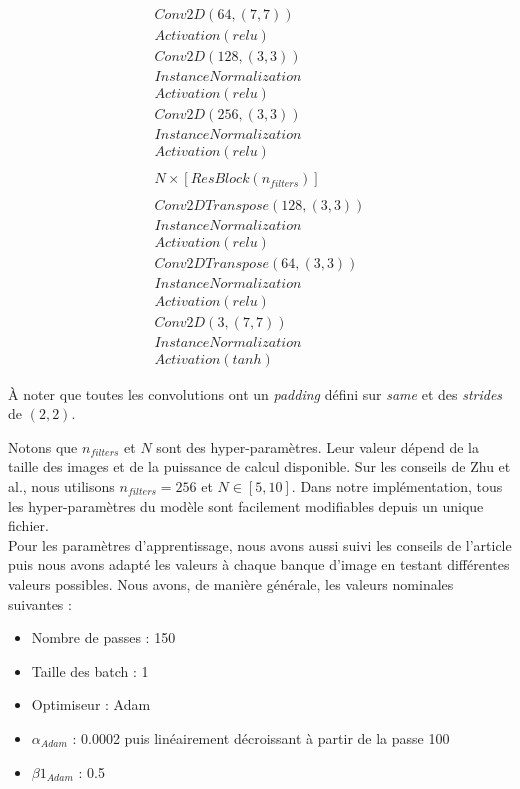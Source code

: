 \[ \begin{array}{lcr}
Conv2D(64, (7,7)) \\
Activation(relu) \\

Conv2D(128, (3,3)) \\
InstanceNormalization\\
Activation(relu)\\

Conv2D(256, (3,3)) \\
InstanceNormalization\\
Activation(relu)\\\\

N \times [ResBlock(n_{filters})]\\\\

Conv2DTranspose(128, (3,3)) \\
InstanceNormalization\\
Activation(relu)\\

Conv2DTranspose(64, (3,3)) \\
InstanceNormalization\\
Activation(relu)\\

Conv2D(3, (7,7)) \\
InstanceNormalization\\

Activation(tanh) \end{array}\]

À noter que toutes les convolutions ont un \textit{padding} défini sur \textit{same} et des \textit{strides} de $(2, 2)$.

Notons que $n_{filters}$ et $N$ sont des hyper-paramètres. Leur valeur dépend de la taille des images et de la puissance de calcul disponible. Sur les conseils de Zhu et al., nous utilisons $n_{filters} = 256$ et $N \in [5, 10]$. Dans notre implémentation, tous les hyper-paramètres du modèle sont facilement modifiables depuis un unique fichier. \\


Pour les paramètres d'apprentissage, nous avons aussi suivi les conseils de l'article puis nous avons adapté les valeurs à chaque banque d'image en testant différentes valeurs possibles. Nous avons, de manière générale, les valeurs nominales suivantes : \\

\begin{itemize}
  \item Nombre de passes : 150
  \item Taille des batch : 1
  \item Optimiseur : Adam
  \item $\alpha_{Adam}$ : 0.0002 puis linéairement décroissant à partir de la passe 100
  \item $\beta1_{Adam}$ : 0.5\\
\end{itemize}

